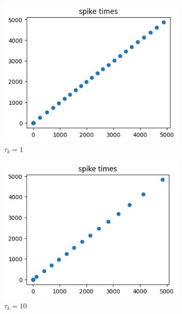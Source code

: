 \documentclass[12pt]{extreport}
\theoremstyle{definition}
\begin{document}
\begin{itemize}
\begin{figure}[H]
\centering
  \begin{subfigure}[b]{0.3\textwidth}
    \includegraphics[width=\textwidth]{Figs/aelif_tau_k=1_s.png}
    \caption{$\tau_k=1$}
  \end{subfigure}
  \hfill
  \begin{subfigure}[b]{0.3\textwidth}
    \includegraphics[width=\textwidth]{Figs/aelif_tau_k=10_s.png}
    \caption{$\tau_k=10$}
  \end{subfigure}
	\hfill
  \begin{subfigure}[b]{0.3\textwidth}

\end{subfigure}
\end{figure}
\end{itemize}
\end{document}
